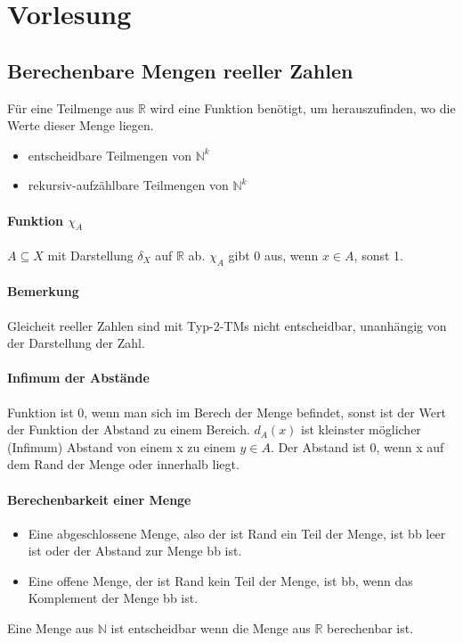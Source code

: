 \documentclass[ngerman]{scrartcl}
\begin{document}
\section{Vorlesung}
\subsection{Berechenbare Mengen reeller Zahlen}
Für eine Teilmenge aus $ \mathbb{R} $ wird eine Funktion benötigt, um herauszufinden, wo die Werte dieser Menge liegen. 
\begin{itemize}
  \item entscheidbare Teilmengen von $ \mathbb{N}^k $
  \item rekursiv-aufzählbare Teilmengen von $ \mathbb{N}^k $
\end{itemize}
\paragraph{Funktion $ \chi_A $}  $ A \subseteq X $ mit Darstellung $ \delta_X $ auf $ \mathbb{R} $ ab. $ \chi_A $ gibt 0 aus, wenn $ x \in A $, sonst 1.

\paragraph{Bemerkung} Gleicheit reeller Zahlen sind mit Typ-2-TMs nicht entscheidbar, unanhängig von der Darstellung der Zahl.

\paragraph{Infimum der Abstände} Funktion ist 0, wenn man sich im Berech der Menge befindet, sonst ist der Wert der Funktion der Abstand zu einem Bereich. $ d_A(x) $ ist kleinster möglicher (Infimum) Abstand von einem x zu einem $ y \in A $. Der Abstand ist 0, wenn x auf dem Rand der Menge oder innerhalb liegt. 

\paragraph{Berechenbarkeit einer Menge}
 \begin{itemize}
   \item Eine abgeschlossene Menge, also der ist Rand ein Teil der Menge, ist bb leer ist oder der Abstand zur Menge bb ist.
   \item Eine offene Menge, der ist Rand kein Teil der Menge, ist bb, wenn das Komplement der Menge bb ist.
 \end{itemize}
Eine Menge aus $\mathbb{N}$ ist entscheidbar wenn die Menge aus $\mathbb{R}$ berechenbar ist.
\end{document}
